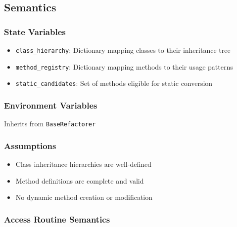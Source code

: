 \documentclass[12pt, titlepage]{article}
\begin{document}
\subsection{Semantics}

\subsubsection{State Variables}
\begin{itemize}
  \item \texttt{class\_hierarchy}: Dictionary mapping classes to their inheritance tree
  \item \texttt{method\_registry}: Dictionary mapping methods to their usage patterns
  \item \texttt{static\_candidates}: Set of methods eligible for static conversion
\end{itemize}

\subsubsection{Environment Variables}
Inherits from \texttt{BaseRefactorer}

\subsubsection{Assumptions}
\begin{itemize}
  \item Class inheritance hierarchies are well-defined
  \item Method definitions are complete and valid
  \item No dynamic method creation or modification
\end{itemize}

\subsubsection{Access Routine Semantics}
\end{document}
